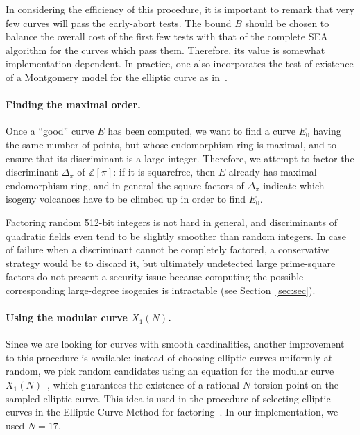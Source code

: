 \documentclass{llncs}
\newcommand{\Z}{\mathbb{Z}}
\begin{document}
In considering the efficiency of this procedure, it is important to remark
that very few curves will pass the early-abort tests. 
The bound $B$ should be chosen 
to balance the overall cost of the first few tests with that of
the complete SEA algorithm for the curves which pass them. Therefore,
its value is somewhat implementation-dependent. In practice, one also
incorporates the test of existence of a Montgomery model for the
elliptic curve as in~\cite{OKS00}.

\paragraph{Finding the maximal order.}
Once a ``good'' curve $E$ has been computed, we want to find a curve
$E_0$ having the same number of points, but whose endomorphism ring is maximal, and
to ensure that its discriminant is a large integer. Therefore, we attempt to
factor the discriminant $Δ_\pi$ of $\Z[\pi]$: if it is squarefree,
then $E$ already has maximal endomorphism ring, and in general the square
factors of $Δ_\pi$ indicate which isogeny volcanoes have to be climbed up
in order to find $E_0$.

\begin{remark}
    Factoring random 512-bit integers is not hard in general, 
    and discriminants of quadratic fields
    even tend to be slightly smoother than random integers.
    In case of failure when a discriminant cannot be completely factored,
		a conservative strategy would be to discard it,
    but ultimately undetected large prime-square factors
    do not present a security issue
    because computing the possible corresponding large-degree isogenies 
    is intractable (see Section~\ref{sec:sec}).
\end{remark}

\paragraph{Using the modular curve $X_1(N)$.}
Since we are looking for curves with smooth cardinalities, another
improvement to this procedure is available: instead of choosing elliptic
curves uniformly at random, we pick random candidates using
an equation for the modular curve $X_1(N)$~\cite{sutherland2012constructing},
which guarantees the existence of a rational $N$-torsion point
on the sampled elliptic curve.
This idea is used
in the procedure of selecting elliptic curves in the Elliptic Curve Method
for factoring~\cite{ECM20,GMP-ECM}.
In our implementation, we used $N = 17$. 
\end{document}
